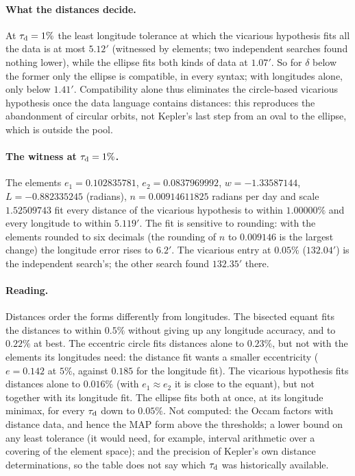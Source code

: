 \paragraph{What the distances decide.} At $\tau_{\rm d}=1\%$ the least longitude tolerance at which the vicarious hypothesis fits all the data is at most $5.12'$ (witnessed by elements; two independent searches found nothing lower), while the ellipse fits both kinds of data at $1.07'$. So for $\delta$ below the former only the ellipse is compatible, in every syntax; with longitudes alone, only below $1.41'$. Compatibility alone thus eliminates the circle-based vicarious hypothesis once the data language contains distances: this reproduces the abandonment of circular orbits, not Kepler's last step from an oval to the ellipse, which is outside the pool.

\paragraph{The witness at $\tau_{\rm d}=1\%$.} The elements $e_1=0.102835781$, $e_2=0.0837969992$, $w=-1.33587144$, $L=-0.882335245$ (radians), $n=0.00914611825$ radians per day and scale $1.52509743$ fit every distance of the vicarious hypothesis to within $1.00000\%$ and every longitude to within $5.119'$. The fit is sensitive to rounding: with the elements rounded to six decimals (the rounding of $n$ to $0.009146$ is the largest change) the longitude error rises to $6.2'$. The vicarious entry at $0.05\%$ ($132.04'$) is the independent search's; the other search found $132.35'$ there.

\paragraph{Reading.} Distances order the forms differently from longitudes. The bisected equant fits the distances to within $0.5\%$ without giving up any longitude accuracy, and to $0.22\%$ at best. The eccentric circle fits distances alone to $0.23\%$, but not with the elements its longitudes need: the distance fit wants a smaller eccentricity ($e=0.142$ at $5\%$, against $0.185$ for the longitude fit). The vicarious hypothesis fits distances alone to $0.016\%$ (with $e_1\approx e_2$ it is close to the equant), but not together with its longitude fit. The ellipse fits both at once, at its longitude minimax, for every $\tau_{\rm d}$ down to $0.05\%$. Not computed: the Occam factors with distance data, and hence the MAP form above the thresholds; a lower bound on any least tolerance (it would need, for example, interval arithmetic over a covering of the element space); and the precision of Kepler's own distance determinations, so the table does not say which $\tau_{\rm d}$ was historically available.

